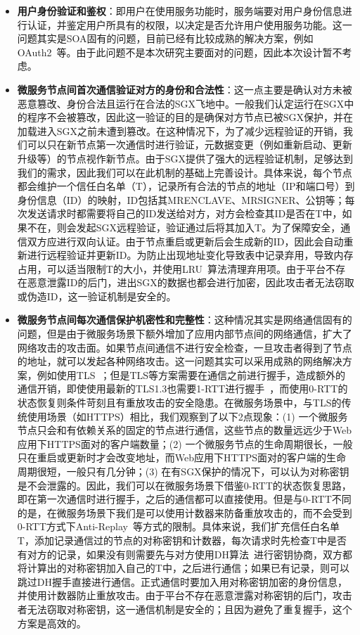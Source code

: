 \begin{itemize}
    \item \textbf{用户身份验证和鉴权}：即用户在使用服务功能时，服务端要对用户身份信息进行认证，并鉴定用户所具有的权限，以决定是否允许用户使用服务功能。这一问题其实是SOA固有的问题，目前已经有比较成熟的解决方案，例如OAuth2~\cite{}等。由于此问题不是本次研究主要面对的问题，因此本次设计暂不考虑。
    \item \textbf{微服务节点间首次通信验证对方的身份和合法性}：这一点主要是确认对方未被恶意篡改、身份合法且运行在合法的SGX飞地中。一般我们认定运行在SGX中的程序不会被篡改，因此这一验证的目的是确保对方节点已被SGX保护，并在加载进入SGX之前未遭到篡改。在这种情况下，为了减少远程验证的开销，我们可以只在新节点第一次通信时进行验证，元数据变更（例如重新启动、更新升级等）的节点视作新节点。由于SGX提供了强大的远程验证机制，足够达到我们的需求，因此我们可以在此机制的基础上完善设计。具体来说，每个节点都会维护一个信任白名单（T），记录所有合法的节点的地址（IP和端口号）到身份信息（ID）的映射，ID包括其MRENCLAVE、MRSIGNER、公钥等；每次发送请求时都需要将自己的ID发送给对方，对方会检查其ID是否在T中，如果不在，则会发起SGX远程验证，验证通过后将其加入T。为了保障安全，通信双方应进行双向认证。由于节点重启或更新后会生成新的ID，因此会自动重新进行远程验证并更新ID。为防止出现地址变化导致表中记录弃用，导致内存占用，可以适当限制T的大小，并使用LRU~\cite{}算法清理弃用项。由于平台不存在恶意泄露ID的后门，进出SGX的数据也都会进行加密，因此攻击者无法窃取或伪造ID，这一验证机制是安全的。%
    \item \textbf{微服务节点间每次通信保护机密性和完整性}：这种情况其实是网络通信固有的问题，但是由于微服务场景下额外增加了应用内部节点间的网络通信，扩大了网络攻击的攻击面。如果节点间通信不进行安全检查，一旦攻击者得到了节点的地址，就可以发起各种网络攻击。这一问题其实可以采用成熟的网络解决方案，例如使用TLS~\cite{}；但是TLS等方案需要在通信之前进行握手，造成额外的通信开销，即使使用最新的TLS1.3也需要1-RTT进行握手~\cite{}，而使用0-RTT的状态恢复则条件苛刻且有重放攻击的安全隐患。在微服务场景中，与TLS的传统使用场景（如HTTPS）相比，我们观察到了以下2点现象：(1) 一个微服务节点只会和有依赖关系的固定的节点进行通信，这些节点的数量远远少于Web应用下HTTPS面对的客户端数量；(2) 一个微服务节点的生命周期很长，一般只在重启或更新时才会改变地址，而Web应用下HTTPS面对的客户端的生命周期很短，一般只有几分钟；(3) 在有SGX保护的情况下，可以认为对称密钥是不会泄露的。因此，我们可以在微服务场景下借鉴0-RTT的状态恢复思路，即在第一次通信时进行握手，之后的通信都可以直接使用。但是与0-RTT不同的是，在微服务场景下我们是可以使用计数器来防备重放攻击的，而不会受到0-RTT方式下Anti-Replay~\cite{}等方式的限制。具体来说，我们扩充信任白名单T，添加记录通信过的节点的对称密钥和计数器，每次请求时先检查T中是否有对方的记录，如果没有则需要先与对方使用DH算法~\cite{}进行密钥协商，双方都将计算出的对称密钥加入自己的T中，之后进行通信；如果已有记录，则可以跳过DH握手直接进行通信。正式通信时要加入用对称密钥加密的身份信息，并使用计数器防止重放攻击。由于平台不存在恶意泄露对称密钥的后门，攻击者无法窃取对称密钥，这一通信机制是安全的；且因为避免了重复握手，这个方案是高效的。

\end{itemize}
